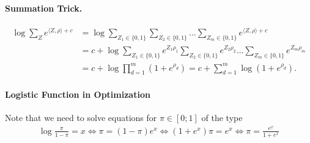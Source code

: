 \documentclass{article}
\begin{document}
\paragraph{Summation Trick.}
\begin{align}
\log \sum_Z e^{\langle Z, \rho \rangle +c} 
& = \log \sum_{Z_1 \in \{0,1\}} \sum_{Z_2  \in \{0,1\}} \dots \sum_{Z_m  \in \{0,1\}}  e^{\langle Z, \rho \rangle + c}  \\ \nonumber
& = c + \log \sum_{Z_1 \in \{0,1\}} e^{Z_1 \rho_1} \sum_{Z_2 \in \{0,1\}} e^{Z_2 \rho_2} \dots \sum_{Z_m \in \{0,1\}}   e^{Z_m \rho_m}  \\ \nonumber
& = c + \log \prod_{d=1}^m (1+ e^{\rho_d})  = c + \sum_{d=1}^m \log (1 + e^{\rho_d}).
\end{align}

\paragraph{Logistic Function in Optimization}

Note that we need to solve equations for $\pi \in [0;1]$ of the type 
\begin{align}
\nonumber
\log \frac{\pi}{1-\pi} = x \iff \pi   = (1-\pi) e^x \iff (1+e^x) \pi = e^x \iff \pi = \frac{e^x}{1+ e^x}
\end{align}




\end{document}
